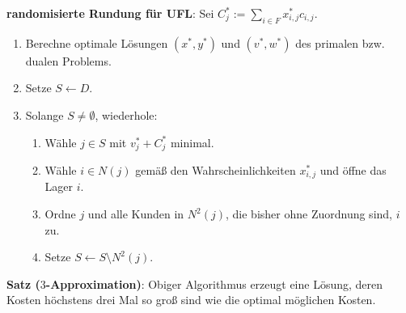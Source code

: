 \textbf{randomisierte Rundung für UFL}:
Sei $C_j^\ast := \sum_{i \in F} x_{i,j}^\ast c_{i,j}$.
\begin{enumerate}
    \item
    Berechne optimale Lösungen $(x^\ast, y^\ast)$ und
    $(v^\ast, w^\ast)$ des primalen bzw. dualen Problems.
    
    \item
    Setze $S \leftarrow D$.
    
    \item
    Solange $S \not= \emptyset$, wiederhole:
    \begin{enumerate}
        \item
        Wähle $j \in S$ mit $v_j^\ast + C_j^\ast$ minimal.
        
        \item
        Wähle $i \in N(j)$ gemäß den Wahrscheinlichkeiten $x_{i,j}^\ast$ und öffne das Lager $i$.
        
        \item
        Ordne $j$ und alle Kunden in $N^2(j)$, die bisher ohne Zuordnung sind, $i$ zu.
        
        \item
        Setze $S \leftarrow S \setminus N^2(j)$.
    \end{enumerate}
\end{enumerate}

\linie

\textbf{Satz ($3$-Approximation)}:
Obiger Algorithmus erzeugt eine Lösung, deren Kosten höchstens
drei Mal so groß sind wie die optimal möglichen Kosten.

